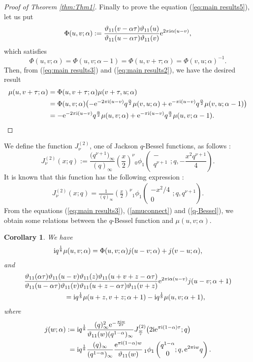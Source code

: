 \documentclass[pdftex]{sigma}
\numberwithin{equation}{section}
\newtheorem{cor}[thm]{Corollary}
\theoremstyle{definition}
\newcommand{\hyper}[4]{\left(\begin{matrix} #1 \\ #2 \end{matrix}; #3, #4\right)}
\begin{document}
\begin{proof}[Proof of Theorem \ref{thm:Thm1}]
Finally to prove the equation (\ref{eq:main results5}), let us put
\[
\Phi(u,v;\alpha):=\frac{\vartheta_{11}(v-\alpha\tau)\vartheta_{11}(u)}{\vartheta_{11}(u-\alpha\tau)\vartheta_{11}(v)}{\rm e}^{2\pi{\rm i}\alpha(u-v)},
\]
which satisfies
\[
\Phi(u,v;\alpha)=\Phi(u,v;\alpha-1)=\Phi(u,v+\tau;\alpha)=\Phi(v,u;\alpha)^{-1}.
\]
Then, from (\ref{eq:main results3}) and (\ref{eq:main results2}), we have the desired result
\begin{align}
\mu(u,v+\tau;\alpha)
 &=
 \Phi(u,v+\tau;\alpha)\mu(v+\tau,u;\alpha) \nonumber \\
 &=
 \Phi(u,v;\alpha)\big({-}{\rm e}^{-2\pi{\rm i}(u-v)}q^\frac{\alpha}{2}\mu(v,u;\alpha)+{\rm e}^{-\pi{\rm i}(u-v)}q^\frac{\alpha}{2}\mu(v,u;\alpha-1)\big)\label{eq:v+tau} \\
 &=
 -{\rm e}^{-2\pi{\rm i}(u-v)}q^\frac{\alpha}{2}\mu(u,v;\alpha)+{\rm e}^{-\pi{\rm i}(u-v)}q^\frac{\alpha}{2}\mu(u,v;\alpha-1).\tag*{\qed}
\end{align}\renewcommand{\qed}{}
\end{proof}

We define the function $J_\nu^{(2)}$, one of Jackson $q$-Bessel functions, as follows \cite[p.~23]{KLS}:
\[
J_\nu^{(2)}(x;q):=\frac{\big(q^{\nu+1}\big)_\infty}{(q)_\infty}\left(\frac{x}{2}\right)^\nu{}_0\phi_1\hyper{-}{q^{\nu+1}}{q}{-\frac{x^2q^{\nu+1}}{4}}.
\]
It is known that this function has the following expression \cite[equation~(3.2)]{Ko}:
\begin{gather}\label{q-Bessel}
J_\nu^{(2)}(x;q)=\frac{1}{(q)_\infty}\left(\frac{x}{2}\right)^\nu{}_1\phi_1\hyper{-x^2/4}{0}{q}{q^{\nu+1}}.
\end{gather}
From the equations (\ref{eq:main results3}), (\ref{amuconnect}) and (\ref{q-Bessel}), we obtain some relations between the $q$-Bessel function and $\mu(u,v;\alpha)$.
\begin{cor}\label{rmk q-Bessel}
We have
\begin{align}\label{mu-j+j}
{\rm i}q^\frac{1}{8}\mu(u,v;\alpha)
 =
 \Phi(u,v;\alpha)j(u-v;\alpha)+j(v-u;\alpha),
\end{align}
and
\begin{gather*}
 \frac{\vartheta_{11}(\alpha\tau)\vartheta_{11}(u-v)\vartheta_{11}(z)\vartheta_{11}(u+v+z-\alpha\tau)}{\vartheta_{11}(u-\alpha\tau)\vartheta_{11}(v)\vartheta_{11}(u+z-\alpha\tau)\vartheta_{11}(v+z)}{\rm e}^{2\pi{\rm i}\alpha(u-v)}j(u-v;\alpha+1)\nonumber\\
 \qquad{}={\rm i}q^\frac{1}{8}\mu(u+z,v+z;\alpha+1)-{\rm i}q^\frac{1}{8}\mu(u,v;\alpha+1),
\end{gather*}
where
\begin{align*}
j(w;\alpha):={}& {\rm i}q^\frac{1}{8}\frac{(q)_\infty^2{\rm e}^{-\frac{\pi{\rm i}w}{2\tau}}}{\vartheta_{11}(w)(q^{1-\alpha})_\infty}J_{\frac{w}{\tau}}^{(2)}\big(2{\rm i}{\rm e}^{\pi{\rm i}(1-\alpha)\tau};q\big)\\
 ={}& {\rm i}q^\frac{1}{8}\frac{(q)_\infty}{(q^{1-\alpha})_\infty}\frac{{\rm e}^{\pi{\rm i}(1-\alpha)w}}{\vartheta_{11}(w)}\,{}_1\phi_1\hyper{q^{1-\alpha}}{0}{q}{{\rm e}^{2\pi{\rm i}w}q}.
\end{align*}
\end{cor}
\end{document}
